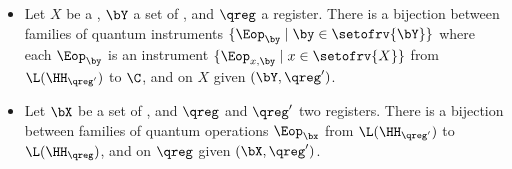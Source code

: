 \begin{lemma}
\label{lem:qcpt_qi}
\hfill
\begin{itemize}
\item
Let $X$ be a \rv, $\bY$ a set of \rvs, and $\qreg$ a register.
There is a bijection between families of quantum instruments $\{\Eop_\by \mid \by\in\setofrv{\bY}\}$ where each $\Eop_\by$ is an instrument $\{\Eop_{x,\by} \mid x\in\setofrv{X}\}$ from $\L(\HH_{\qreg'})$ to $\C$, and \qCPTs on $X$ given $(\bY,\qreg')$.
\item
Let $\bX$ be a set of \rvs, and $\qreg$ and $\qreg'$ two registers.
There is a bijection between families of quantum operations $\Eop_\bx$ from $\L(\HH_{\qreg'})$ to $\L(\HH_\qreg)$, and \qCPTs on $\qreg$ given $(\bX,\qreg')$.
\end{itemize}
\end{lemma}
